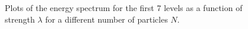 \documentclass[rmp,10pt,onecolumn,fleqn,notitlepage]{revtex4-1}
\begin{document}
\begin{figure}[H]
\begin{minipage}[c]{0.49\linewidth}
\end{minipage}
\begin{minipage}[]{0.49\linewidth}
\centering
{}
\end{minipage}
\caption{\label{fig:results} Plots of the energy spectrum for the first 7 levels as a function of strength \( \lambda  \) for a different number of particles $N$. }
\end{figure}
\end{document}
